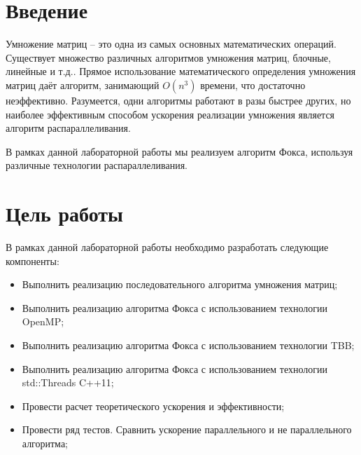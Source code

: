 \documentclass[12pt]{article}
\begin{document}
\setcounter{page}{2}

\tableofcontents
\newpage

\section*{Введение}
Умножение матриц -- это одна из самых основных математических операций. Существует множество различных алгоритмов умножения матриц, блочные, линейные и т.д.. Прямое использование математического определения умножения матриц даёт алгоритм, занимающий \( O \left( n^{3} \right)  \) времени, что достаточно неэффективно. Разумеется, одни алгоритмы работают в разы быстрее других, но наиболее эффективным способом ускорения реализации умножения является алгоритм распараллеливания.\par

В рамках данной лабораторной работы мы реализуем алгоритм Фокса, используя различные технологии распараллеливания.\par

\newpage

\section*{Цель работы}
В рамках данной лабораторной работы необходимо разработать следующие компоненты:

\begin{itemize}
	\item Выполнить реализацию последовательного алгоритма умножения матриц;

	\item Выполнить реализацию алгоритма Фокса с использованием технологии OpenMP;

	\item Выполнить реализацию алгоритма Фокса с использованием технологии TBB;

	\item Выполнить реализацию алгоритма Фокса с использованием технологии std::Threads C++11;
	
	\item Провести расчет теоретического ускорения и эффективности;

\item Провести ряд тестов. Сравнить ускорение параллельного и не параллельного алгоритма;
\end{itemize}
\end{document}
